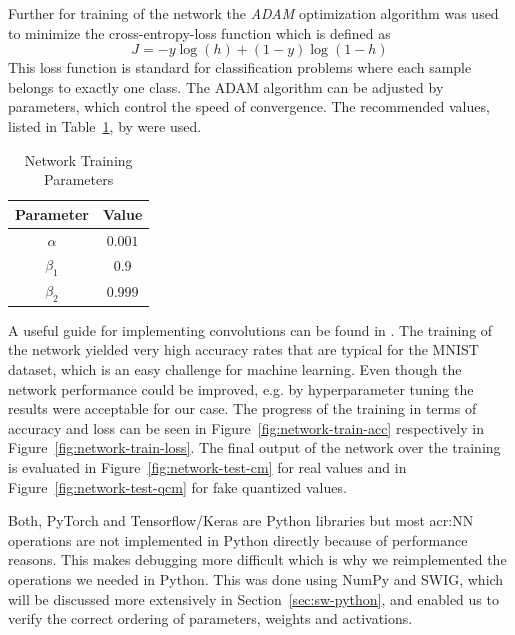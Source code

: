 Further for training of the network the \emph{ADAM} optimization algorithm \cite{Kingma:2014aa} was used to minimize the cross-entropy-loss function which is defined as
\begin{equation}
    J = - y  \log(h) + (1-y)  \log(1-h)
\end{equation}
This loss function is standard for classification problems where each sample belongs to exactly one class. 
The ADAM algorithm can be adjusted by parameters, which control the speed of convergence. The recommended values, listed in Table~\ref{tab:train-params}, by \cite{Kingma:2014aa} were used.
\begin{table}[ht]
	\centering
    \begin{tabular}{cc}
        \toprule
            Parameter & Value \\
        \midrule
            $\alpha$   & $0.001$ \\
            $\beta_1$  & $0.9$   \\
            $\beta_2$  & $0.999$  \\          
        \bottomrule
    \end{tabular}
    \caption{Network Training Parameters}
    \label{tab:train-params}
\end{table}


A useful guide for implementing convolutions can be found in \cite{dumoulin2016guide}. The training of the network yielded very high accuracy rates that are typical for the MNIST dataset, which is an easy challenge for machine learning. Even though the network performance could be improved, e.g. by hyperparameter tuning the results were acceptable for our case. The progress of the training in terms of accuracy and loss can be seen in Figure~\ref{fig:network-train-acc} respectively in Figure~\ref{fig:network-train-loss}. The final output of the network over the training is evaluated in Figure~\ref{fig:network-test-cm} for real values and in Figure~\ref{fig:network-test-qcm} for fake quantized values.

Both, PyTorch and Tensorflow/Keras are Python libraries but most \gls{acr:NN} operations are not implemented in Python directly because of performance reasons. This makes debugging more difficult which is why we reimplemented the operations we needed in Python. This was done using NumPy and SWIG, which will be discussed more extensively in Section~\ref{sec:sw-python}, and enabled us to verify the correct ordering of parameters, weights and activations.

